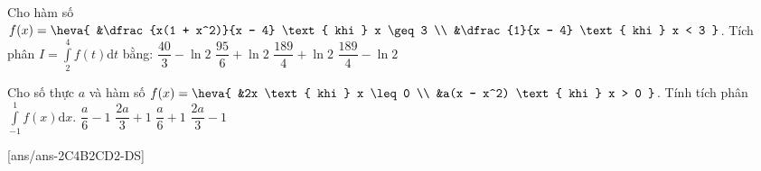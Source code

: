 \begin{ex}%
	Cho hàm số $f(x) = \heva{
		&\dfrac{x(1 + x^2)}{x - 4} \text{ khi } x \geq 3 \\
		&\dfrac{1}{x - 4} \text{ khi } x < 3 
	}$. Tích phân $I = \displaystyle\int\limits_{2}^{4} f(t) \mathrm{d}t$ bằng:
	\choice
	{$\dfrac{40}{3} - \ln 2$}
	{$\dfrac{95}{6} + \ln 2$}
	{$\dfrac{189}{4} + \ln 2$}
	{\True $\dfrac{189}{4} - \ln 2$}
\end{ex}
\begin{ex}%
	Cho số thực $a$ và hàm số $f(x) = \heva{
		&2x \text{ khi } x \leq 0 \\
		&a(x - x^2) \text{ khi } x > 0 
	}$. Tính tích phân $\displaystyle\int\limits_{-1}^{1} f(x) \mathrm{d}x$.
	\choice
	{\True $\dfrac{a}{6} - 1$}
	{$\dfrac{2a}{3} + 1$}
	{$\dfrac{a}{6} + 1$}
	{$\dfrac{2a}{3} - 1$}
\end{ex}
\TNTF
{}[ans/ans-2C4B2CD2-DS]
